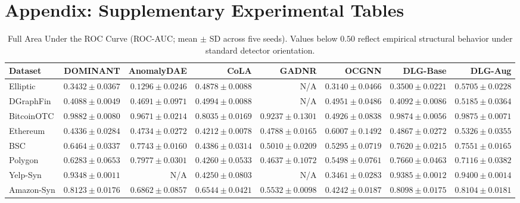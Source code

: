 \documentclass[applsci,article,submit,moreauthors,pdftex]{Definitions/mdpi}
\begin{document}
\newpage
\appendix
\section*{Appendix: Supplementary Experimental Tables}
\label{sec:appendix}

\renewcommand{\thetable}{A\arabic{table}}
\setcounter{table}{0}

\begin{table}[H]
\centering\fontsize{7.2pt}{8.5pt}\selectfont\setlength{\tabcolsep}{1.2pt}
\caption{Full Area Under the ROC Curve (ROC-AUC; mean $\pm$ SD across five seeds). Values below $0.50$ reflect empirical structural behavior under standard detector orientation.}
\label{tab:app_roc_auc_full}
\begin{tabular*}{\textwidth}{@{\extracolsep{\fill}}lrrrrrrr}\toprule
\textbf{Dataset} & \textbf{DOMINANT} & \textbf{AnomalyDAE} & \textbf{CoLA} & \textbf{GADNR} & \textbf{OCGNN} & \textbf{DLG-Base} & \textbf{DLG-Aug} \\\midrule
Elliptic & $0.3432 \pm 0.0367$ & $0.1296 \pm 0.0246$ & $0.4878 \pm 0.0088$ & N/A & $0.3140 \pm 0.0466$ & $0.3500 \pm 0.0221$ & $\mathbf{0.5705 \pm 0.0228}$ \\
DGraphFin & $0.4088 \pm 0.0049$ & $0.4691 \pm 0.0971$ & $0.4994 \pm 0.0088$ & N/A & $0.4951 \pm 0.0486$ & $0.4092 \pm 0.0086$ & $\mathbf{0.5185 \pm 0.0364}$ \\
BitcoinOTC & $\mathbf{0.9882 \pm 0.0080}$ & $0.9671 \pm 0.0214$ & $0.8035 \pm 0.0169$ & $0.9237 \pm 0.1301$ & $0.4926 \pm 0.0838$ & $0.9874 \pm 0.0056$ & $0.9875 \pm 0.0071$ \\
Ethereum & $0.4336 \pm 0.0284$ & $0.4734 \pm 0.0272$ & $0.4212 \pm 0.0078$ & $0.4788 \pm 0.0165$ & $\mathbf{0.6007 \pm 0.1492}$ & $0.4867 \pm 0.0272$ & $0.5326 \pm 0.0355$ \\
BSC & $0.6464 \pm 0.0337$ & $\mathbf{0.7743 \pm 0.0160}$ & $0.4386 \pm 0.0314$ & $0.5010 \pm 0.0209$ & $0.5295 \pm 0.0719$ & $0.7620 \pm 0.0215$ & $0.7551 \pm 0.0165$ \\
Polygon & $0.6283 \pm 0.0653$ & $\mathbf{0.7977 \pm 0.0301}$ & $0.4260 \pm 0.0533$ & $0.4637 \pm 0.1072$ & $0.5498 \pm 0.0761$ & $0.7660 \pm 0.0463$ & $0.7116 \pm 0.0382$ \\
Yelp-Syn & $0.9348 \pm 0.0011$ & N/A & $0.4250 \pm 0.0803$ & N/A & $0.3461 \pm 0.0283$ & $0.9385 \pm 0.0012$ & $\mathbf{0.9400 \pm 0.0014}$ \\
Amazon-Syn & $\mathbf{0.8123 \pm 0.0176}$ & $0.6862 \pm 0.0857$ & $0.6544 \pm 0.0421$ & $0.5532 \pm 0.0098$ & $0.4242 \pm 0.0187$ & $0.8098 \pm 0.0175$ & $0.8104 \pm 0.0181$ \\

\end{tabular*}
\end{table}
\end{document}
